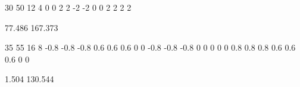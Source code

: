 \exampleSection



\begin{myverbbox}[\small]{\vinput}
    30 50 12 4
    0 0 2 2
    -2 -2 0 0
    2 2 2 2
\end{myverbbox}
\begin{myverbbox}[\small]{\voutput}
    77.486 167.373
\end{myverbbox}


\begin{myverbbox}[\small]{\vinput}
    35 55 16 8
    -0.8 -0.8 -0.8 0.6 0.6 0.6 0 0
    -0.8 -0.8 -0.8 0 0 0 0 0
    0.8 0.8 0.8 0.6 0.6 0.6 0 0
\end{myverbbox}
\begin{myverbbox}[\small]{\voutput}
    1.504 130.544
\end{myverbbox}


